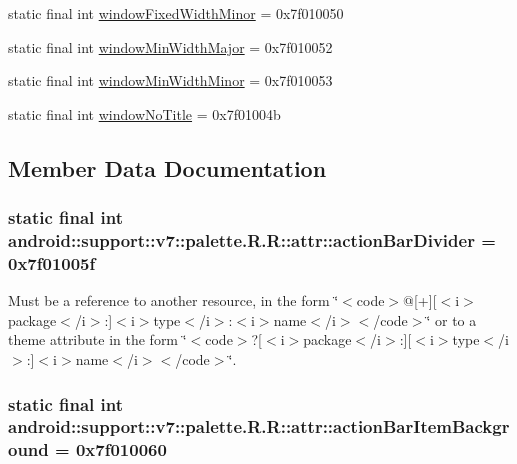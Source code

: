 \begin{CompactItemize}
\item 
static final int \hyperlink{classandroid_1_1support_1_1v7_1_1palette_1_1_r_1_1attr_28ff719fc1be6af767d9bbdfff98f332}{windowFixedWidthMinor} = 0x7f010050
\item 
static final int \hyperlink{classandroid_1_1support_1_1v7_1_1palette_1_1_r_1_1attr_5dc85c24be2bb456de50087876647a9a}{windowMinWidthMajor} = 0x7f010052
\item 
static final int \hyperlink{classandroid_1_1support_1_1v7_1_1palette_1_1_r_1_1attr_83c00d779738c012f7934cc3c135adb9}{windowMinWidthMinor} = 0x7f010053
\item 
static final int \hyperlink{classandroid_1_1support_1_1v7_1_1palette_1_1_r_1_1attr_c89a8f76987eb23742233f385a7b29b7}{windowNoTitle} = 0x7f01004b
\end{CompactItemize}


\subsection{Member Data Documentation}
\hypertarget{classandroid_1_1support_1_1v7_1_1palette_1_1_r_1_1attr_ead98acd46209a3222f530a6061e2f92}{
\subsubsection[{actionBarDivider}]{\setlength{\rightskip}{0pt plus 5cm}static final int android::support::v7::palette.R.R::attr::actionBarDivider = 0x7f01005f}}
\label{classandroid_1_1support_1_1v7_1_1palette_1_1_r_1_1attr_ead98acd46209a3222f530a6061e2f92}


Must be a reference to another resource, in the form \char`\"{}$<$code$>$@\mbox{[}+\mbox{]}\mbox{[}$<$i$>$package$<$/i$>$:\mbox{]}$<$i$>$type$<$/i$>$:$<$i$>$name$<$/i$>$$<$/code$>$\char`\"{} or to a theme attribute in the form \char`\"{}$<$code$>$?\mbox{[}$<$i$>$package$<$/i$>$:\mbox{]}\mbox{[}$<$i$>$type$<$/i$>$:\mbox{]}$<$i$>$name$<$/i$>$$<$/code$>$\char`\"{}. \hypertarget{classandroid_1_1support_1_1v7_1_1palette_1_1_r_1_1attr_be33ab71c2ea5fa97b8c8c3ba8f2eb8c}{
\subsubsection[{actionBarItemBackground}]{\setlength{\rightskip}{0pt plus 5cm}static final int android::support::v7::palette.R.R::attr::actionBarItemBackground = 0x7f010060}}
\label{classandroid_1_1support_1_1v7_1_1palette_1_1_r_1_1attr_be33ab71c2ea5fa97b8c8c3ba8f2eb8c}


